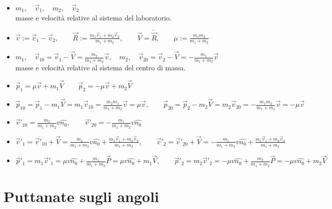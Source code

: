 \documentclass[a4paper,NoNotes,GeneralMath,12pt]{stdmdoc}
\begin{document}
	\begin{itemize}
		\item $m_1, \quad \vec{v}_1, \quad m_2, \quad \vec{v}_2$ \\ masse e velocità relative al sistema del laboratorio.
		\item $\vec{v} := \vec{v}_1 - \vec{v}_2, \qquad \vec{R} := \frac{m_1\vec{r}_1 + m_2\vec{r}_2}{m_1 + m_2}, \qquad \vec{V} = \dot{\vec{R}}, \qquad \mu := \frac{m_1m_2}{m_1+m_2}$
		\item $m_1, \quad \vec{v}_{10} = \vec{v}_1 - \vec{V} = \frac{m_2}{m_1 + m_2} \vec{v}, \quad m_2, \quad \vec{v}_{20} = \vec{v}_2 - \vec{V} = -\frac{m_1}{m_1 + m_2} \vec{v}$ \\ masse e velocità relative al sistema del centro di massa.
		\item $\vec{p}_1 = \mu \vec{v} + m_1 \vec{V} \qquad \vec{p}_2 = -\mu \vec{v} + m_2 \vec{V}$
		\item $\vec{p}_{10} = \vec{p}_1 - m_1\vec{V} = m_1 \vec{v}_{10} = \frac{m_2m_1}{m_1 + m_2} \vec{v} = \mu \vec{v}, \qquad \vec{p}_{20} = \vec{p}_2 - m_2\vec{V} = m_2 \vec{v}_{20} = -\frac{m_1m_2}{m_1 + m_2} \vec{v} = - \mu \vec{v}$
		\item $\vec{v}'_{10} = \frac{m_2}{m_1 + m_2} v \hat{n_0}, \qquad \vec{v}'_{20} = - \frac{m_1}{m_1 + m_2} v \hat{n_0}$
		\item $\vec{v}'_1 = \vec{v}'_{10} + \vec{V} = \frac{m_2}{m_1 + m_2} v \hat{n_0} + \frac{m_1\vec{v}_1 + m_2 \vec{v}_2}{m_1 + m_2}, \qquad \vec{v}'_2 = \vec{v}'_{20} + \vec{V} = - \frac{m_1}{m_1 + m_2} v \hat{n_0} + \frac{m_1\vec{v}_1 + m_2\vec{v}_2}{m_1 + m_2}$
		\item $\vec{p}'_1 = m_1\vec{v}'_1 = \mu v \hat{n_0} + \frac{m_1}{m_1 + m_2} \vec{P} = \mu v \hat{n_0} + m_1 \vec{V}, \qquad \vec{p}'_2 = m_2 \vec{v}'_2 = - \mu v \hat{n_0} + \frac{m_2}{m_1+m_2} \vec{P} = - \mu v \hat{n_0} + m_2 \vec{V}$
	\end{itemize}

	\section*{Puttanate sugli angoli}
\end{document}
